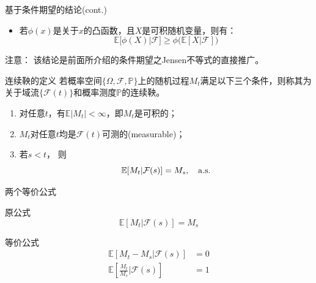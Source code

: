 \documentclass[t]{beamer}
\renewcommand{\Pr}{\mathbb{P}}
\newcommand{\E}{\mathbb{E}}
\begin{document}
      \begin{frame}{基于条件期望的结论(cont.)}
      \begin{itemize}
      \item 若$\phi(x)$是关于$x$的凸函数，且$X$是可积随机变量，则有：
      \begin{equation*}
      \E\big[\phi(X)|\mathcal{F} \big]\ge \phi\big(\E[X|\mathcal{F}] \big)
      \end{equation*}
      
      \end{itemize}
      
      \begin{block}{注意：}
      该结论是前面所介绍的条件期望之Jensen不等式的直接推广。
      \end{block}
      
      \end{frame}
      
      \begin{frame}{连续鞅的定义}
      若概率空间$\{\Omega, \mathcal{F}, \Pr\}$上的随机过程$M_t$满足以下三个条件，则称其为关于域流$\{\mathcal{F}(t)\}$和概率测度$\Pr$的连续鞅。
      \begin{enumerate}
        \item 对任意$t$，有$\E|M_t|<\infty$，即$M_t$是可积的；
        \item $M_t$对任意$t$均是$\mathcal{F}(t)$可测的(measurable)；
      \item 若$s<t$， 则
      \begin{equation*}
      \E[M_t|\mathcal{F}(s)]=M_s,\quad {\rm a.s.}
      \end{equation*}
      \end{enumerate}
      \end{frame}
      
      \begin{frame}{两个等价公式}
      \begin{block}{原公式}
      \[\E[M_t|\mathcal{F}(s)]=M_s\]
      \end{block}
      
      \begin{block}{等价公式}
      \begin{align*}
      \E[M_t-M_s|\mathcal{F}(s)]&=0\\
      \E\left[\frac{M_t}{M_s}\Big|\mathcal{F}(s)\right]&=1
      \end{align*}
      \end{block}
      
      \end{frame}
      
\end{document}
